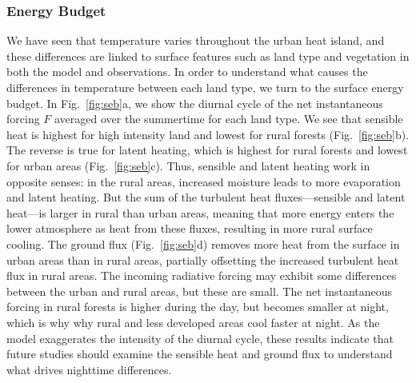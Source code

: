 \documentclass[draft,linenumbers]{agujournal}
\begin{document}
\subsubsection{ Energy Budget}
We have seen that temperature varies throughout the urban heat island, and these differences are linked to surface features such as land type and vegetation in both the model and observations. 
In order to understand what causes the differences in temperature between each land type, we turn to the surface energy budget. In Fig.~\ref{fig:seb}a, we show the diurnal cycle of the net instantaneous forcing $F$ averaged over the summertime for each land type. We see that sensible heat is highest for high intensity land and lowest for rural forests (Fig.~\ref{fig:seb}b). The reverse is true for latent heating, which is highest for rural forests and lowest for urban areas  (Fig.~\ref{fig:seb}c). Thus, sensible and latent heating work in opposite senses: in the rural areas, increased moisture leads to more evaporation and latent heating. But the sum of the turbulent heat fluxes---sensible and latent heat---is larger in rural than urban areas, meaning that more energy enters the lower atmosphere as heat from these fluxes, resulting in more rural surface cooling. The ground flux  (Fig.~\ref{fig:seb}d) removes more heat from the surface in urban areas than in rural areas, partially offsetting the increased turbulent heat flux in rural areas. The incoming radiative forcing may exhibit some differences between the urban and rural areas, but these are small. 
The net instantaneous forcing in rural forests is higher during the day, but becomes smaller at night, which is why why rural and less developed areas cool faster at night. 
As the model exaggerates the intensity of the diurnal cycle, these results indicate that future studies should examine the sensible heat and ground flux to understand what drives nighttime differences. 
\end{document}
